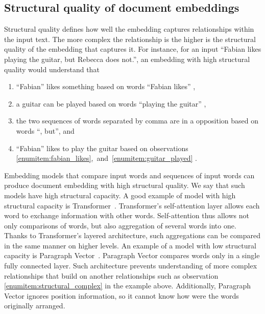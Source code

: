 \subsection{Structural quality of document embeddings}

Structural quality defines how well the embedding captures relationships within
the input text. The more complex the relationship is the higher is the
structural quality of the embedding that captures it. For instance, for an
input ``Fabian likes playing the guitar, but Rebecca does not.'', an embedding
with high structural quality would understand that

\begin{enumerate}

  \item ``Fabian'' likes something based on words ``Fabian likes''
    \label{enumitem:fabian_likes},

  \item a guitar can be played based on words ``playing the guitar''
    \label{enumitem:guitar_played},

  \item the two sequences of words separated by comma are in a opposition based
    on words ``, but'', and

  \item ``Fabian'' likes to play the guitar based on observations
    \ref{enumitem:fabian_likes},~and~\ref{enumitem:guitar_played}
    \label{enumitem:structural_complex}.

\end{enumerate}

Embedding models that compare input words and sequences of input words can
produce document embedding with high structural quality. We say that such models
have high structural capacity. A good example of model with high structural
capacity is Transformer~\citep{vaswani2017attention}. Transformer's
self-attention layer allows each word to exchange information with other words.
Self-attention thus allows not only comparisons of words, but also aggregation
of several words into one. Thanks to Transformer's layered architecture, such
aggregations can be compared in the same manner on higher levels. An example of
a model with low structural capacity is Paragraph
Vector~\citep{le2014distributed}. Paragraph Vector compares words only in a
single fully connected layer. Such architecture prevents understanding of more
complex relationships that build on another relationships such as observation
\ref{enumitem:structural_complex} in the example above. Additionally, Paragraph
Vector ignores position information, so it cannot know how were the words
originally arranged.

